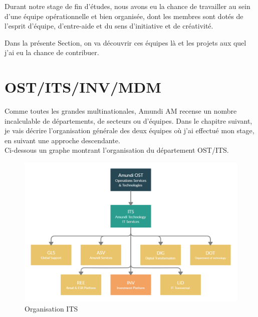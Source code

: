 \par Durant notre stage de fin d’études, nous avons eu la chance de travailler au sein d’une équipe opérationnelle et bien organisée, dont les membres sont dotés de l’esprit d’équipe, d’entre-aide et du sens d’initiative et de créativité.
\par Dans la présente Section, on va découvrir ces équipes là et les projets aux quel j'ai eu la chance de contribuer.

\begingroup
\let\clearpage\relax
\chapter{OST/ITS/INV/MDM}
\endgroup

\par Comme toutes les grandes multinationales, Amundi AM recense un nombre incalculable de départements, de secteurs ou d'équipes. Dans le chapitre suivant, je vais décrire l’organisation générale des deux équipes où j’ai effectué mon stage, en suivant une approche descendante. \\ Ci-dessous un graphe montrant l'organisation du département OST/ITS.
\begin{figure}[ht]
    \centering
    \includegraphics[width=\columnwidth]{img/Org ITS.png}
    \caption{Organisation ITS}
\end{figure}

